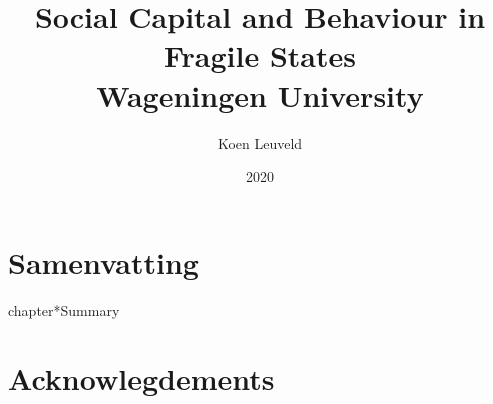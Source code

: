 



\title{
	{Social Capital and Behaviour in Fragile States}\\
	{\large Wageningen University}\\
}
\author{Koen Leuveld}
\date{2020}

\maketitle
\tableofcontents
\todototoc
\listoftodos

 








\clearpage
{}
\chapter*{Samenvatting}


\clearpage
{}
chapter*{Summary}


\chapter*{Acknowlegdements}








